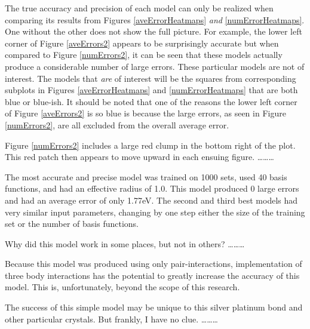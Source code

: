 \par The true accuracy and precision of each model can only be realized when comparing its results from Figures \ref{aveErrorHeatmaps} \textit{and} \ref{numErrorHeatmaps}. One without the other does not show the full picture. For example, the lower left corner of Figure \ref{aveErrors2} appears to be surprisingly accurate but when compared to Figure \ref{numErrors2}, it can be seen that these models actually produce a considerable number of large errors. These particular models are not of interest. The models that \textit{are} of interest will be the squares from corresponding subplots in Figures \ref{aveErrorHeatmaps} and \ref{numErrorHeatmaps} that are both blue or blue-ish. It should be noted that one of the reasons the lower left corner of Figure \ref{aveErrors2} is so blue is because the large errors, as seen in Figure \ref{numErrors2}, are all excluded from the overall average error.
\par Figure \ref{numErrors2} includes a large red clump in the bottom right of the plot. This red patch then appears to move upward in each ensuing figure. \ldots \ldots \ldots
\par The most accurate and precise model was trained on 1000 sets, used 40 basis functions, and had an effective radius of 1.0. This model produced 0 large errors and had an average error of only 1.77eV. The second and third best models had very similar input parameters, changing by one step either the size of the training set or the number of basis functions.
\par Why did this model work in some places, but not in others? \ldots \ldots \ldots
\par Because this model was produced using only pair-interactions, implementation of three body interactions has the potential to greatly increase the accuracy of this model. This is, unfortunately, beyond the scope of this research.
\par The success of this simple model may be unique to this silver platinum bond and other particular crystals. But frankly, I have no clue. \ldots\ldots\ldots





